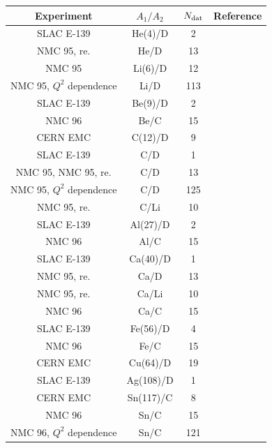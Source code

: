 \begin{table}[t]
  \centering
  \small
\begin{tabular}{c c c c}
\hline
Experiment & $A_1/A_2$ & $N_{\rm dat}$ & Reference\\
\hline
\hline
  SLAC E-139 & He(4)/D & 2 & \cite{PhysRevD.49.4348} \\
  NMC 95, re. & He/D & 13 & \cite{Amaudruz:1995tq}\\
\hline
  NMC 95 & Li(6)/D & 12 & \cite{Arneodo:1995cs}\\
  NMC 95, $Q^2$ dependence & Li/D & 113 &\cite{Arneodo:1995cs}\\
\hline
  SLAC E-139 & Be(9)/D & 2 & \cite{PhysRevD.49.4348}\\
  NMC 96 & Be/C & 15 & \cite{Arneodo:1996rv}\\
\hline
  CERN EMC & C(12)/D & 9 & \cite{Ashman:1992kv}\\
  SLAC E-139 & C/D & 1 & \cite{PhysRevD.49.4348}\\
  NMC 95, NMC 95, re.  & C/D & 13 & \cite{Arneodo:1995cs,Amaudruz:1995tq}\\
  NMC 95, $Q^2$ dependence & C/D & 125 & \cite{Arneodo:1995cs}\\
  NMC 95, re. & C/Li & 10 & \cite{Amaudruz:1995tq}\\
\hline
  SLAC E-139 & Al(27)/D & 2 & \cite{PhysRevD.49.4348}\\
  NMC 96 & Al/C & 15 & \cite{Arneodo:1996rv}\\
\hline
  SLAC E-139 & Ca(40)/D & 1 & \cite{PhysRevD.49.4348}\\
  NMC 95, re. & Ca/D & 13 & \cite{Amaudruz:1995tq}\\
  NMC 95, re. & Ca/Li & 10 & \cite{Amaudruz:1995tq}\\
  NMC 96 & Ca/C & 15 & \cite{Arneodo:1996rv}\\
\hline
  SLAC E-139 & Fe(56)/D & 4 & \cite{PhysRevD.49.4348}\\
  NMC 96 & Fe/C & 15 & \cite{Arneodo:1996rv}\\
\hline
  CERN EMC & Cu(64)/D & 19 & \cite{Ashman:1992kv}\\
\hline
  SLAC E-139 & Ag(108)/D & 1 & \cite{PhysRevD.49.4348}\\
\hline
 CERN EMC & Sn(117)/C & 8 & \cite{Ashman:1992kv}\\
 NMC 96 & Sn/C & 15 & \cite{Arneodo:1996rv}\\
 NMC 96, $Q^2$ dependence  & Sn/C & 121 & \cite{Arneodo:1996ru}\\

\end{tabular}
\end{table}
